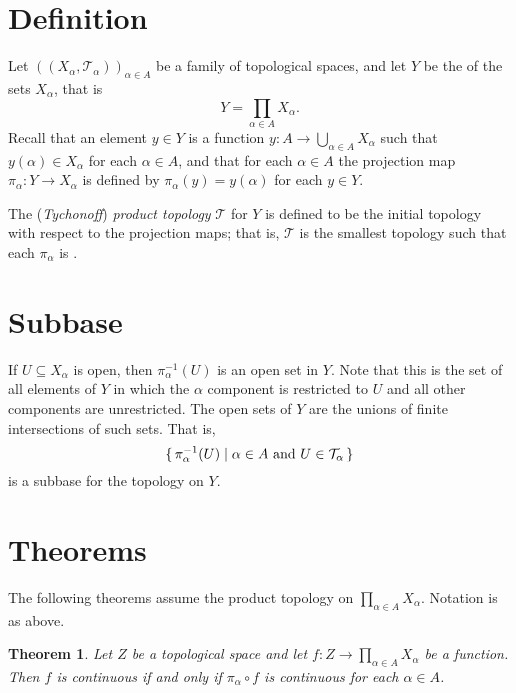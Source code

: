 \documentclass[12pt]{article}
\def\T{{\mathcal T}}
\newtheorem{theorem}{Theorem}
\begin{document}

\section*{Definition}

Let $((X_\alpha,\T_\alpha))_{\alpha\in A}$
be a family of topological spaces, and let $Y$ be the 
of the sets $X_\alpha$, that is
\[
  Y = \prod_{\alpha\in A} X_\alpha.
\]
Recall that an element $y\in Y$ is a function
$y\colon A\to \bigcup_{\alpha\in A} X_\alpha$ 
such that $y(\alpha) \in X_\alpha$ for each $\alpha \in A$,
and that for each $\alpha\in A$
the projection map $\pi_\alpha\colon Y\to X_\alpha$
is defined by $\pi_\alpha(y) = y(\alpha)$ for each $y\in Y$.

The (\emph{Tychonoff}) \emph{product topology} $\T$ for $Y$
is defined to be the initial topology with respect to the projection maps;
that is,
$\T$ is the smallest topology such that each $\pi_\alpha$ is .

\section*{Subbase}

If $U\subseteq X_\alpha$ is open,
then $\pi_\alpha^{-1}(U)$ is an open set in $Y$.
Note that this is the set of all elements of $Y$ 
in which the $\alpha$ component is restricted to $U$
and all other components are unrestricted.
The open sets of $Y$ are the unions of finite intersections of such sets.
That is,
\[
  \{\, \pi_\alpha^{-1}(U) \mid \alpha\in A\hbox{ and }U\in\T_\alpha \,\}
\]
is a subbase for the topology on $Y$.

\section*{Theorems}

The following theorems assume the product topology on
$\prod_{\alpha\in A}X_\alpha$.
Notation is as above.

\begin{theorem}
Let $Z$ be a topological space
and let $f\colon Z\to\prod_{\alpha\in A}X_\alpha$ be a function.
Then $f$ is continuous if and only if $\pi_\alpha\circ f$ is continuous
for each $\alpha\in A$.
\end{theorem}
\end{document}
